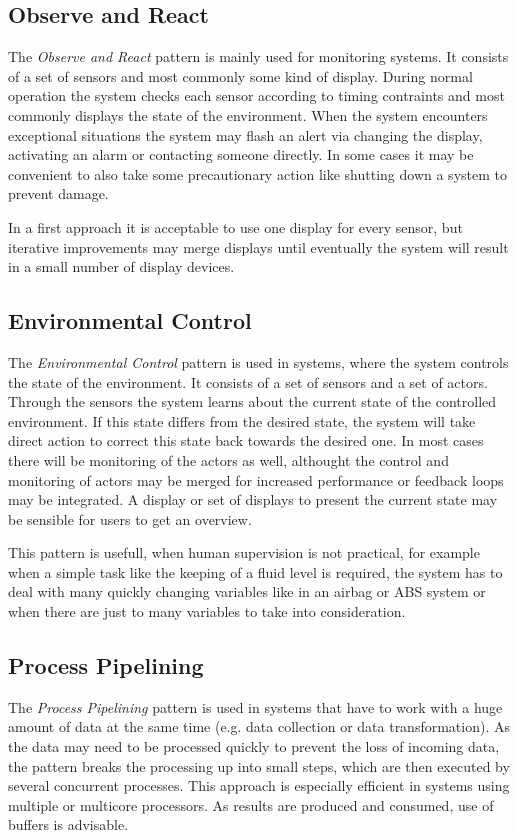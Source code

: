 \documentclass[10pt,a4paper,titlepage,draft]{article} %
\begin{document}
\subsection{Observe and React}
The \emph{Observe and React} pattern is mainly used for monitoring systems.
It consists of a set of sensors and most commonly some kind of display.
During normal operation the system checks each sensor according to timing contraints and most commonly displays the state of the environment.
When the system encounters exceptional situations the system may flash an alert via changing the display, activating an alarm or contacting someone directly.
In some cases it may be convenient to also take some precautionary action like shutting down a system to prevent damage.

In a first approach it is acceptable to use one display for every sensor, but iterative improvements may merge displays until eventually the system will result in a small number of display devices.

\subsection{Environmental Control}
The \emph{Environmental Control} pattern is used in systems, where the system controls the state of the environment.
It consists of a set of sensors and a set of actors.
Through the sensors the system learns about the current state of the controlled environment.
If this state differs from the desired state, the system will take direct action to correct this state back towards the desired one.
In most cases there will be monitoring of the actors as well, althought the control and monitoring of actors may be merged for increased performance or feedback loops may be integrated.
A display or set of displays to present the current state may be sensible for users to get an overview.

This pattern is usefull, when human supervision is not practical, for example when a simple task like the keeping of a fluid level is required, the system has to deal with many quickly changing variables like in an airbag or ABS system or when there are just to many variables to take into consideration.

\subsection{Process Pipelining}
The \emph{Process Pipelining} pattern is used in systems that have to work with a huge amount of data at the same time (e.g. data collection or data transformation).
As the data may need to be processed quickly to prevent the loss of incoming data, the pattern breaks the processing up into small steps, which are then executed by several concurrent processes.
This approach is especially efficient in systems using multiple or multicore processors.
As results are produced and consumed, use of buffers is advisable.
\end{document}
